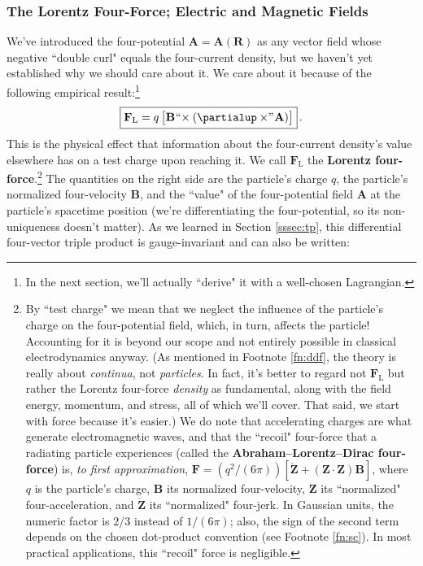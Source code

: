 \documentclass[12pt]{article}
\renewcommand{\vv}[1]{\mathbf{#1}}
\begin{document}
\subsubsection{The Lorentz Four-Force; Electric and Magnetic Fields}\label{sssec:lff}

We've introduced the four-potential $\vv A = \vv A (\vv R)$ as any vector field whose negative ``double curl" equals the four-current density, but we haven't yet established why we should care about it. We care about it because of the following empirical result:\footnote{In the next section, we'll actually ``derive" it with a well-chosen Lagrangian.}
\begin{equation}\label{eq:ff}
\boxed{\vv F_{\textrm{L}} = q \, \bigl[ \vv B \mkern1mu `` \mkern-4mu \times (\partialup \times \mkern-4mu " \mkern1mu \vv A) \bigr]} \, .
\end{equation}
This is the physical effect that information about the four-current density's value elsewhere has on a test charge upon reaching it. We call $\vv F_{\textrm{L}}$ the \textbf{Lorentz four-force}.\footnote{\label{fn:recoil}By ``test charge" we mean that we neglect the influence of the particle's charge on the four-potential field, which, in turn, affects the particle! Accounting for it is beyond our scope and not entirely possible in classical electrodynamics anyway. (As mentioned in Footnote \ref{fn:ddf}, the theory is really about \emph{continua}, not \emph{particles}. In fact, it's better to regard not $\vv F_{\textrm{L}}$ but rather the Lorentz four-force \emph{density} as fundamental, along with the field energy, momentum, and stress, all of which we'll cover. That said, we start with force because it's easier.) We do note that accelerating charges are what generate electromagnetic waves, and that the ``recoil" four-force that a radiating particle experiences (called the \textbf{Abraham--Lorentz--Dirac four-force}) is, \emph{to first approximation}, $\vv F = (q^2 / (6 \pi))[\mathring{\vv Z} + (\vv Z \cdot \vv Z) \vv B]$, where $q$ is the particle's charge, $\vv B$ its normalized four-velocity, $\vv Z$ its ``normalized" four-acceleration, and $\mathring{\vv Z}$ its ``normalized" four-jerk. In Gaussian units, the numeric factor is $2/3$ instead of $1/(6 \pi)$; also, the sign of the second term depends on the chosen dot-product convention (see Footnote \ref{fn:sc}). In most practical applications, this ``recoil" force is negligible.} The quantities on the right side are the particle's charge $q$, the particle's normalized four-velocity $\vv B$, and the ``value" of the four-potential field $\vv A$ at the particle's spacetime position (we're differentiating the four-potential, so its non-uniqueness doesn't matter). As we learned in Section \ref{sssec:tp}, this differential four-vector triple product is gauge-invariant and can also be written:
\end{document}
